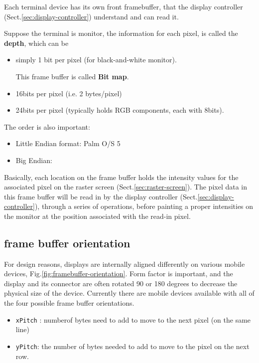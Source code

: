 Each terminal device has its own front framebuffer, that the display controller
(Sect.\ref{sec:display-controller}) understand and can read it.

Suppose the terminal is monitor, the information for each pixel, is called the
{\bf depth}, which can be
\begin{itemize}
  \item simply 1 bit per pixel (for black-and-white monitor). 

This frame buffer is called {\bf Bit map}.

  \item 16bits per pixel (i.e. 2 bytes/pixel)
  

  \item 24bits per pixel (typically holds RGB components, each with 8bits).
  
\end{itemize}
The order is also important: 
\begin{itemize}
  \item  Little Endian format: Palm O/S 5
  
  \item Big Endian: 
\end{itemize}

Basically, each location on the frame buffer holds the intensity values for the
associated pixel on the raster screen (Sect.\ref{sec:raster-screen}).
The pixel data in this frame buffer will be read in by the display controller
(Sect.\ref{sec:display-controller}), through a series of operations, before
painting a proper intensities on the monitor at the position associated with the
read-in pixel.

\subsection{frame buffer orientation}
\label{sec:frame-buffer-orientation}

For  design  reasons,  displays  are  internally  aligned  differently  on
various mobile devices, Fig.\ref{fig:framebuffer-orientation}. Form factor is
important, and the display and  its  connector  are  often  rotated  90  or  180
 degrees  to  decrease the physical size of the device. Currently there are
mobile devices available  with  all  of  the  four  possible  frame  buffer 
orientations.
\begin{itemize}
  \item \verb!xPitch! : numberof bytes need to add to move to the next pixel
  (on the same line)
  
  \item \verb!yPitch!: the number of bytes needed to add to move to the pixel on
  the next row.
\end{itemize}

